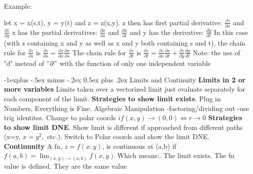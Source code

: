 \documentclass[10pt,landscape]{article}
\makeatletter
\renewcommand{\subsection}{\@startsection{subsection}{2}{0mm}%
                                {-1explus -.5ex minus -.2ex}%
                                {0.5ex plus .2ex}%
                                {\normalfont\normalsize\bfseries}}
\makeatother
\begin{document}
\begin{multicols*}{5}
Example:\newline

let x = x(s,t), y = y(t) and z = z(x,y).\newline
z then has first partial derivative:\newline
$ \frac{\partial z}{\partial x} $ and $ \frac{\partial z}{\partial y} $ \newline
x has the partial derivatives:\newline
$ \frac{\partial x}{\partial s} $ and $ \frac{\partial x}{\partial t} $ \newline
and y has the derivative:\newline
$ \frac{dy}{dt} $ \newline
In this case (with z containing x and y as well as x and y both containing s and t), the chain rule for $ \frac{\partial z}{\partial s} $ is $ \frac{\partial z}{\partial s} = \frac{\partial z}{\partial x} \frac{\partial x}{\partial s} $\newline
The chain rule for $ \frac{\partial z}{\partial t} $ is $ \frac{\partial z}{\partial t} = \frac{\partial z}{\partial x} \frac{\partial x}{\partial t} + \frac{\partial z}{\partial y} \frac{dy}{dt}$\newline
Note: the use of "d" instead of $ "\partial" $ with the function of only one independent variable\newline

\subsection{Limits and Continuity}
\textbf{Limits in 2 or more variables}\newline
Limits taken over a vectorized limit just evaluate separately for each component of the limit.\newline
\textbf{Strategies to show limit exists}. Plug in Numbers, Everything is Fine. Algebraic Manipulation\newline
-factoring/dividing out\newline
-use trig identites. Change to polar coords\newline
\:\:$if (x,y)\to(0,0)\Leftrightarrow r\to0$\newline
\textbf{Strategies to show limit DNE}. Show limit is different if approached from different paths\newline
(x=y, $x=y^2,$ etc.). Switch to Polar coords and show the limit DNE.\newline
\textbf{Continunity}\newline
A fn, $z=f(x,y)$, is continuous at (a,b) if\newline
$f(a,b) = \lim_{(x,y) \to (a,b)} f(x,y) $\newline
Which means:. The limit exists. The fn value is defined. They are the same value


\end{multicols*}
\end{document}
